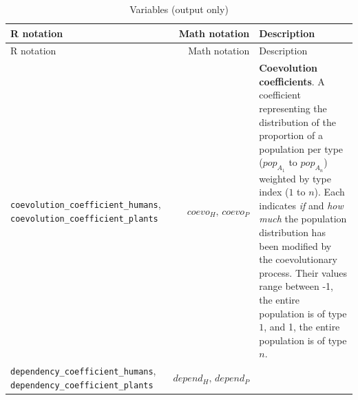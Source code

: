 \documentclass[
]{book}
\begin{document}
\begin{longtable}[]{@{}lrl@{}}
\caption{Variables (output only)}\tabularnewline
\toprule
\begin{minipage}[b]{0.36\columnwidth}\raggedright
R notation\strut
\end{minipage} & \begin{minipage}[b]{0.22\columnwidth}\raggedleft
Math notation\strut
\end{minipage} & \begin{minipage}[b]{0.34\columnwidth}\raggedright
Description\strut
\end{minipage}\tabularnewline
\midrule
\endfirsthead
\toprule
\begin{minipage}[b]{0.36\columnwidth}\raggedright
R notation\strut
\end{minipage} & \begin{minipage}[b]{0.22\columnwidth}\raggedleft
Math notation\strut
\end{minipage} & \begin{minipage}[b]{0.34\columnwidth}\raggedright
Description\strut
\end{minipage}\tabularnewline
\midrule
\endhead
\begin{minipage}[t]{0.36\columnwidth}\raggedright
\texttt{coevolution\_coefficient\_humans}, \texttt{coevolution\_coefficient\_plants}\strut
\end{minipage} & \begin{minipage}[t]{0.22\columnwidth}\raggedleft
\(coevo_{H},\,coevo_{P}\)\strut
\end{minipage} & \begin{minipage}[t]{0.34\columnwidth}\raggedright
\textbf{Coevolution coefficients}. A coefficient representing the distribution of the proportion of a population per type (\(pop_{A_1}\) to \(pop_{A_n}\)) weighted by type index (\(1\) to \(n\)). Each indicates \emph{if} and \emph{how much} the population distribution has been modified by the coevolutionary process. Their values range between -1, the entire population is of type \(1\), and 1, the entire population is of type \(n\).\strut
\end{minipage}\tabularnewline
\begin{minipage}[t]{0.36\columnwidth}\raggedright
\texttt{dependency\_coefficient\_humans}, \texttt{dependency\_coefficient\_plants}\strut
\end{minipage} & \begin{minipage}[t]{0.22\columnwidth}\raggedleft
\(depend_{H},\,depend_{P}\)\strut
\end{minipage} & \begin{minipage}[t]{0.34\columnwidth}\raggedright

\end{minipage}
\end{longtable}
\end{document}
